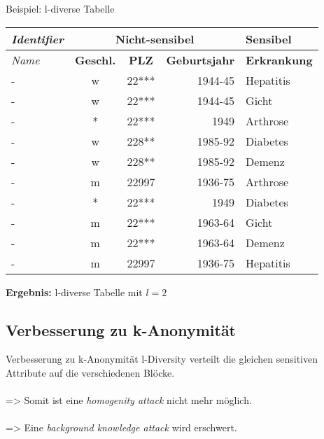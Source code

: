 \begin{frame}{Beispiel: l-diverse Tabelle}
	\begin{center}
			\begin{tabular}{|l|c|c|r|l|}
		\hline \textit{Identifier} & \multicolumn{3}{c|}{\textbf{Nicht-sensibel}} & \textbf{Sensibel} \\ 
		\hline \textit{Name} & \textbf{Geschl.} & \textbf{PLZ} & \textbf{Geburtsjahr} & \textbf{Erkrankung} \\ \hline
		\hline \rowcolor{svshellblau1!30} 	- & w & 22*** & 1944-45 & Hepatitis \\ 
		\hline \rowcolor{svshellblau1!30}	- & w & 22*** & 1944-45 & Gicht \\ 
		\hline \rowcolor{svsgrau1!30} 		- & * & 22*** & 1949 & Arthrose \\ 
		\hline \rowcolor{svshellblau2!30} 	- & w & 228** & 1985-92 & Diabetes \\
		\hline \rowcolor{svshellblau2!30} 	- & w & 228** & 1985-92 & Demenz \\  
		\hline \rowcolor{white} 		- & m & 22997 & 1936-75 & Arthrose \\ 
		\hline \rowcolor{svsgrau1!30} 		- & * & 22*** & 1949 & Diabetes \\ 
		\hline \rowcolor{svsrot!30} 		- & m & 22*** & 1963-64 & Gicht \\ 
		\hline \rowcolor{svsrot!30} 		- & m & 22*** & 1963-64 & Demenz \\ 
		\hline \rowcolor{white} 		- & m & 22997 & 1936-75 & Hepatitis \\ 
		\hline 
		\end{tabular}
		\vspace{0.5cm}
        \pause
		\textbf{Ergebnis: }l-diverse Tabelle mit \(l=2\)
	\end{center}
\end{frame}

\subsection{Verbesserung zu k-Anonymität}

\begin{frame}{Verbesserung zu k-Anonymität}
l-Diversity verteilt die gleichen sensitiven Attribute auf die verschiedenen Blöcke.\\
\ \\	=> Somit ist eine \textit{homogenity attack} nicht mehr möglich.\\
\ \\	=> Eine \textit{background knowledge attack} wird erschwert.\\
\ \\ \cite{machanavajjhala_l_diversity}

\end{frame}

